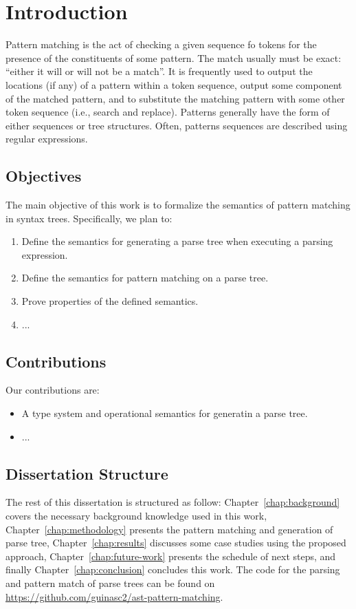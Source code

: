 \chapter{Introduction}\label{chap:intro}

Pattern matching is the act of checking a given sequence fo tokens for the presence
of the constituents of some pattern. The match usually must be exact: ``either it 
will or will not be a match''. It is frequently used to output the locations (if any)
of a pattern within a token sequence, output some component of the matched pattern,
and to substitute the matching pattern with some other token sequence (i.e., search
and replace). Patterns generally have the form of either sequences or tree structures.
Often, patterns sequences are described using regular expressions.


\section{Objectives}\label{sec:objectives}

The main objective of this work is to formalize the semantics of pattern matching
in syntax trees. Specifically, we plan to:
\begin{enumerate}
    \item Define the semantics for generating a parse tree when executing a parsing expression.
    \item Define the semantics for pattern matching on a parse tree.
    \item Prove properties of the defined semantics.
    \item ...
\end{enumerate}

\section{Contributions}\label{sec:contributions}

Our contributions are:
\begin{itemize}
    \item A type system and operational semantics for generatin a parse tree.
    \item ...
\end{itemize}

\section{Dissertation Structure}\label{sec:structure}

The rest of this dissertation is structured as follow: Chapter~\ref{chap:background}
covers the necessary background knowledge used in this work, Chapter~\ref{chap:methodology}
presents the pattern matching and generation of parse tree, Chapter~\ref{chap:results}
discusses some case studies using the proposed approach, Chapter~\ref{chap:future-work}
presents the schedule of next steps, and finally Chapter~\ref{chap:conclusion} concludes
this work.
The code for the parsing and pattern match of parse trees can be found on 
\url{https://github.com/guinasc2/ast-pattern-matching}.

\cleardoublepage